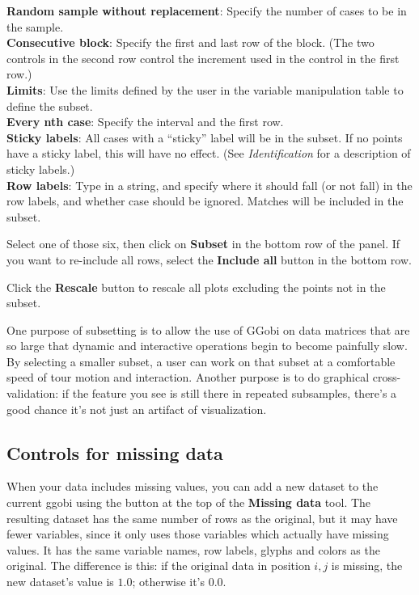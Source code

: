 \documentclass[11pt]{article}
\begin{document}
{\bf Random sample without replacement}:  Specify the number of
     cases to be in the sample.
\\{\bf Consecutive block}:  Specify the first and last row of the block.
     (The two controls in the second row control the increment used
     in the control in the first row.)
\\{\bf Limits}:  Use the limits defined by the user in the variable
     manipulation table to define the subset.
\\{\bf Every nth case}:  Specify the interval and the first row.
\\{\bf Sticky labels}:  All cases with a ``sticky'' label will
  be in the subset.  If no points have a sticky label, this
  will have no effect. (See {\em Identification} for a description
  of sticky labels.)
\\{\bf Row labels}: Type in a string, and specify where it should
  fall (or not fall) in the row labels, and whether case should
  be ignored.  Matches will be included in the subset.

Select one of those six, then click on {\bf Subset} in the
bottom row of the panel.  If you want to re-include all rows, 
select the {\bf Include all} button in the bottom row.

Click the {\bf Rescale} button to rescale all plots excluding
the points not in the subset.

One purpose of subsetting is to allow the use of GGobi on data matrices
that are so large that dynamic and interactive operations begin to
become painfully slow.  By selecting a smaller subset, a user can
work on that subset at a comfortable speed of tour motion and
interaction.  Another purpose is to do graphical cross-validation:
if the feature you see is still there in repeated subsamples, there's
a good chance it's not just an artifact of visualization.

\subsection{Controls for missing data}

When your data includes missing values, you can add a new dataset to the
current ggobi using the button at the top of the {\bf Missing data} tool.
The resulting dataset has the same number of rows as the original,
but it may have fewer variables, since it only uses those variables
which actually have missing values.  It has the same variable names,
row labels, glyphs and colors as the original.  The difference is this:
if the original data in position $i,j$ is missing, the new dataset's
value is $1.0$; otherwise it's $0.0$.
\end{document}
